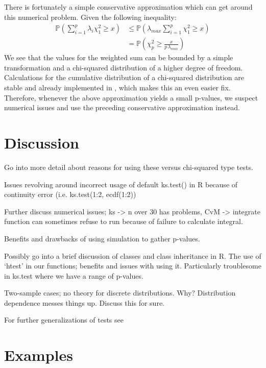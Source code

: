 \documentclass[article]{jss}
\begin{document}
There is fortunately a simple conservative approximation which can get around this numerical problem. Given the
following inequality:
\begin{align*}
\mathbb{P} \left(\sum_{i=1}^{p} \lambda_i \chi^2_1 \geq x \right) &\leq \mathbb{P} \left( \lambda_{max} \sum_{i=1}^{p} \chi^2_1 \geq x \right) \\
&= \mathbb{P} \left(\chi^2_p \geq \frac{x}{p \, \lambda_{max}} \right)
\end{align*}
We see that the values for the weighted sum can be bounded by a simple transformation and a chi-squared distribution
of a higher degree of freedom. Calculations for the cumulative distribution of a chi-squared distribution are stable
and already implemented in , which makes this an even easier fix. Therefore, whenever the above approximation
yields a small p-values, we suspect numerical issues and use the preceding conservative approximation instead.

\section{Discussion}

Go into more detail about reasons for using these versus chi-squared type tests. 

Issues revolving around incorrect usage of default ks.test() in R because of continuity error (i.e. ks.test(1:2, ecdf(1:2))

Further discuss numerical issues; ks -> n over 30 has problems, CvM -> integrate function can sometimes refuse to run because of failure to calculate integral.

Benefits and drawbacks of using simulation to gather p-values. 

Possibly go into a brief discussion of classes and class inheritance in R. The use of `htest' in our functions; benefits and issues with using it. Particularly troublesome in ks.test where we have a range of p-values.

Two-sample cases; no theory for discrete distributions. Why? Distribution dependence messes things up. Discuss this for sure.

For further generalizations of tests see \cite{dewev1973}

\section{Examples}


%

\end{document}
